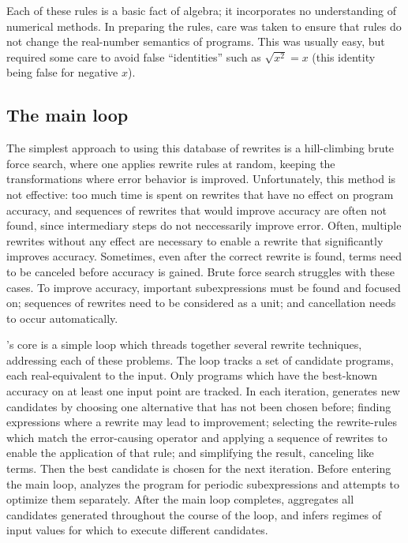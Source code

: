 \documentclass[paper.tex]{subfiles}
\begin{document}
Each of these rules is a basic fact of algebra;
  it incorporates no understanding of numerical methods.
In preparing the rules,
  care was taken to ensure that rules
  do not change the real-number semantics of programs.
This was usually easy, but required some care
  to avoid false ``identities'' such as $\sqrt{x^2} = x$
  (this identity being false for negative $x$).

\subsection{The main loop}

The simplest approach to using this database of rewrites
  is a hill-climbing brute force search,
  where one applies rewrite rules at random,
  keeping the transformations where error behavior is improved.
Unfortunately, this method is not effective:
  too much time is spent on rewrites
  that have no effect on program accuracy,
  and sequences of rewrites that would improve accuracy
  are often not found, since intermediary steps do not neccessarily improve error.
Often, multiple rewrites without any effect
  are necessary to enable a rewrite that significantly improves accuracy.
Sometimes, even after the correct rewrite is found,
  terms need to be canceled before accuracy is gained.
Brute force search struggles with these cases.
To improve accuracy, important subexpressions
  must be found and focused on;
  sequences of rewrites need to be considered as a unit;
  and cancellation needs to occur automatically.

\casio's core is a simple loop
  which threads together several rewrite techniques,
  addressing each of these problems.
The loop tracks a set of candidate programs,
  each real-equivalent to the input.
Only programs which have the best-known accuracy
  on at least one input point are tracked.
In each iteration, \casio generates new candidates
  by choosing one alternative that has not been chosen before;
  finding expressions where a rewrite may lead to improvement;
  selecting the rewrite-rules which match the error-causing operator
  and applying a sequence of rewrites to enable the application of that rule;
  and simplifying the result, canceling like terms.
Then the best candidate is chosen for the next iteration.
Before entering the main loop,
  \casio analyzes the program for periodic subexpressions
  and attempts to optimize them separately.
After the main loop completes,
  \casio aggregates all candidates generated
  throughout the course of the loop,
  and infers regimes of input values for which
  to execute different candidates.
\end{document}
